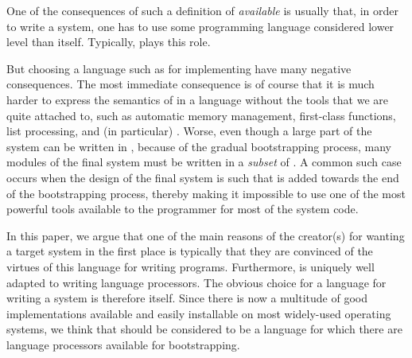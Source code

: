 One of the consequences of such a definition of \emph{available} is
usually that, in order to write a \commonlisp{} system, one has to use
some programming language considered lower level than \commonlisp{}
itself.  Typically, \clanguage{} plays this role.

But choosing a language such as \clanguage{} for implementing
\commonlisp{} have many negative consequences.  The most immediate
consequence is of course that it is much harder to express the
semantics of \commonlisp{} in a language without the tools that we are
quite attached to, such as automatic memory management, first-class
functions, list processing, and (in particular) \clos{}.  Worse, even
though a large part of the system can be written in \commonlisp{},
because of the gradual bootstrapping process, many modules of the
final system must be written in a \emph{subset} of \commonlisp{}.  A
common such case occurs when the design of the final system is such
that \clos{} is added towards the end of the bootstrapping process,
thereby making it impossible to use one of the most powerful tools
available to the programmer for most of the system code.

In this paper, we argue that one of the main reasons of the creator(s)
for wanting a target \commonlisp{} system in the first place is
typically that they are convinced of the virtues of this language for
writing programs.  Furthermore, \commonlisp{} is uniquely well adapted
to writing language processors.  The obvious choice for a language for
writing a \commonlisp{} system is therefore \commonlisp{} itself.
Since there is now a multitude of good \commonlisp{} implementations
available and easily installable on most widely-used operating
systems, we think that \commonlisp{} should be considered to be a
language for which there are language processors available for
bootstrapping.
